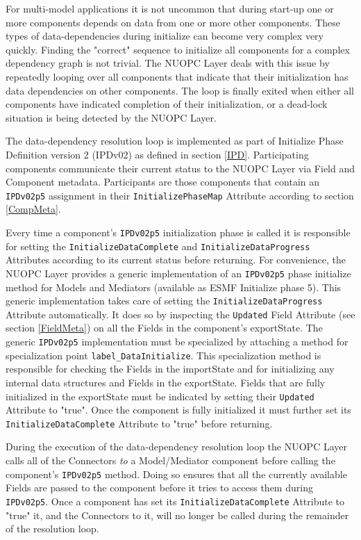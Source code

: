 %

\label{DataDepInit}

For multi-model applications it is not uncommon that during start-up one or more components depends on data from one or more other components. These types of data-dependencies during initialize can become very complex very quickly. Finding the "correct" sequence to initialize all components for a complex dependency graph is not trivial. The NUOPC Layer deals with this issue by repeatedly looping over all components that indicate that their initialization has data dependencies on other components. The loop is finally exited when either all components have indicated completion of their initialization, or a dead-lock situation is being detected by the NUOPC Layer.

The data-dependency resolution loop is implemented as part of Initialize Phase Definition version 2 (IPDv02) as defined in section \ref{IPD}. Participating components communicate their current status to the NUOPC Layer via Field and Component metadata. Participants are those components that contain an {\tt IPDv02p5} assignment in their {\tt InitializePhaseMap} Attribute according to section \ref{CompMeta}.  

Every time a component's {\tt IPDv02p5} initialization phase is called it is responsible for setting the {\tt InitializeDataComplete} and {\tt InitializeDataProgress} Attributes according to its current status before returning. For convenience, the NUOPC Layer provides a generic implementation of an {\tt IPDv02p5} phase initialize method for Models and Mediators (available as ESMF Initialize phase 5). This generic implementation takes care of setting the {\tt InitializeDataProgress} Attribute automatically. It does so by inspecting the {\tt Updated} Field Attribute (see section \ref{FieldMeta}) on all the Fields in the component's exportState. The generic {\tt IPDv02p5} implementation must be specialized by attaching a method for specialization point {\tt label\_DataInitialize}. This specialization method is responsible for checking the Fields in the importState and for initializing any internal data structures and Fields in the exportState. Fields that are fully initialized in the exportState must be indicated by setting their {\tt Updated} Attribute to "true". Once the component is fully initialized it must further set its {\tt InitializeDataComplete} Attribute to "true" before returning.

During the execution of the data-dependency resolution loop the NUOPC Layer calls all of the Connectors {\em to} a Model/Mediator component before calling the component's {\tt IPDv02p5} method. Doing so ensures that all the currently available Fields are passed to the component before it tries to access them during {\tt IPDv02p5}. Once a component has set its {\tt InitializeDataComplete} Attribute to "true" it, and the Connectors to it, will no longer be called during the remainder of the resolution loop. 

